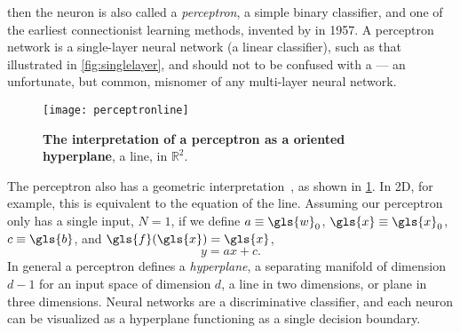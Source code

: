 \documentclass[thesis]{subfiles}
\begin{document}
then the neuron is also called a \emph{perceptron}, a simple binary classifier, and one of the earliest connectionist learning methods, invented by \citet{rosenblatt1958perceptron} in 1957. A perceptron network is a single-layer neural network (\ie a linear classifier), such as that illustrated in \cref{fig:singlelayer}, and should not to be confused with a  --- an unfortunate, but common, misnomer of any multi-layer neural network.
\begin{figure}[tbp]
\centering
\texttt{[image: perceptronline]}
\caption[The interpretation of a perceptron as a hyperplane]{\textbf{The interpretation of a perceptron as a oriented hyperplane}, \ie a line, in $\mathbb{R}^2$.}
\label{fig:hyperplane}
\end{figure}
The perceptron also has a geometric interpretation~\citep{Bishop1995}, as shown in \cref{fig:hyperplane}. In 2D, for example, this is equivalent to the equation of the line. Assuming our perceptron only has a single input, \ie $N=1$, if we define $a\equiv \gls{w}_0$, $\gls{x} \equiv \gls{x}_0$, $c \equiv \gls{b}$, and $\gls{f}(\gls{x}) = \gls{x}$,
%
\begin{equation}
y = a x + c.
\end{equation}
%
In general a perceptron defines a \emph{hyperplane}, a separating manifold of dimension $d - 1$ for an input space of dimension $d$, a line in two dimensions, or plane in three dimensions. Neural networks are a discriminative classifier, and each neuron can be visualized as a hyperplane functioning as a single decision boundary.
\end{document}
